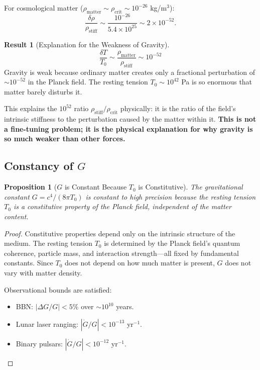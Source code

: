 \documentclass[11pt,a4paper]{article}
\newcommand{\rhocrit}{\ensuremath{\rho_{\mathrm{crit}}}}
\newcommand{\rhostiff}{\ensuremath{\rho_{\mathrm{stiff}}}}
\newcommand{\Tzero}{\ensuremath{T_0}}
\newtheorem{proposition}{Proposition}
\theoremstyle{definition}
\newtheorem{result}{Result}
\begin{document}
For cosmological matter ($\rho_{\mathrm{matter}} \sim \rhocrit \sim 10^{-26}$ kg/m$^3$):
\begin{equation}
\frac{\delta \rho}{\rhostiff} \sim \frac{10^{-26}}{5.4 \times 10^{25}} \sim 2 \times 10^{-52}.
\end{equation}

\begin{result}[Explanation for the Weakness of Gravity]
\label{result:gravity_weak}
\begin{equation}
\boxed{\frac{\delta T}{\Tzero} \sim \frac{\rho_{\mathrm{matter}}}{\rhostiff} \sim 10^{-52}}
\end{equation}
Gravity is weak because ordinary matter creates only a fractional perturbation of $\sim 10^{-52}$ in the Planck field. The resting tension $\Tzero \sim 10^{42}$ Pa is so enormous that matter barely disturbs it.
\end{result}

This explains the $10^{52}$ ratio $\rhostiff/\rhocrit$ physically: it is the ratio of the field's intrinsic stiffness to the perturbation caused by the matter within it. \textbf{This is not a fine-tuning problem; it is the physical explanation for why gravity is so much weaker than other forces.}

\subsection{Constancy of $G$}
\label{sec:G_constant}

\begin{proposition}[$G$ is Constant Because $\Tzero$ is Constitutive]
\label{prop:G_constant}
The gravitational constant $G = c^4/(8\pi \Tzero)$ is constant to high precision because the resting tension $\Tzero$ is a constitutive property of the Planck field, independent of the matter content.
\end{proposition}

\begin{proof}
Constitutive properties depend only on the intrinsic structure of the medium. The resting tension $\Tzero$ is determined by the Planck field's quantum coherence, particle mass, and interaction strength---all fixed by fundamental constants. Since $\Tzero$ does not depend on how much matter is present, $G$ does not vary with matter density.

Observational bounds are satisfied:
\begin{itemize}
    \item BBN: $|\Delta G/G| < 5\%$ over $\sim 10^{10}$ years.
    \item Lunar laser ranging: $|\dot{G}/G| < 10^{-13}$ yr$^{-1}$.
    \item Binary pulsars: $|\dot{G}/G| < 10^{-12}$ yr$^{-1}$.
\end{itemize}
\end{proof}
\end{document}

